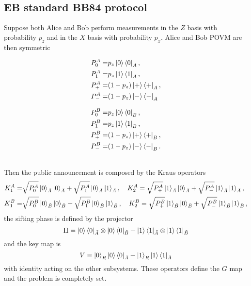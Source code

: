 \documentclass{article}
\begin{document}
    \subsection{EB standard BB84 protocol}
    Suppose both Alice and Bob perform measurements in the \(Z\) basis with probability \(p_z\) and in the \(X\) basis with probability \(p_x\).
    Alice and Bob POVM are then symmetric
    \\
    \begin{minipage}{.5\linewidth}
        \begin{align*}
            P^A_0 =& p_z \ket{0}\bra{0}_A,\\
            P^A_1 =& p_z \ket{1}\bra{1}_A,\\
            P^A_+ =& (1-p_z) \ket{+}\bra{+}_A,\\
            P^A_- =& (1-p_z) \ket{-}\bra{-}_A
        \end{align*}
    \end{minipage}
    \begin{minipage}{.5\linewidth}
        \begin{align*}
            P^B_0 =& p_z \ket{0}\bra{0}_B,\\
            P^B_1 =& p_z \ket{1}\bra{1}_B,\\
            P^B_+ =& (1-p_z) \ket{+}\bra{+}_B,\\
            P^B_- =& (1-p_z) \ket{-}\bra{-}_B.
        \end{align*}
    \end{minipage}
    \\
    Then the public announcement is composed by the Kraus operators
    \begin{align*}
        K^A_1 =& \sqrt{P^A_0}\ket{0}_{\tilde{A}}\ket{0}_{\bar{A}}+\sqrt{P^A_1}\ket{0}_{\tilde{A}}\ket{1}_{\bar{A}},\quad K^A_2 = \sqrt{P^A_+}\ket{1}_{\tilde{A}}\ket{0}_{\bar{A}}+\sqrt{P^A_-}\ket{1}_{\tilde{A}}\ket{1}_{\bar{A}},\\
        K^B_1 =& \sqrt{P^B_0}\ket{0}_{\tilde{B}}\ket{0}_{\bar{B}}+\sqrt{P^B_1}\ket{0}_{\tilde{B}}\ket{1}_{\bar{B}},\quad K^B_2 = \sqrt{P^B_+}\ket{1}_{\tilde{B}}\ket{0}_{\bar{B}}+\sqrt{P^B_-}\ket{1}_{\tilde{B}}\ket{1}_{\bar{B}},
    \end{align*}
    the sifting phase is defined by the projector
    \[\Pi=\ket{0}\bra{0}_{\tilde{A}}\otimes\ket{0}\bra{0}_{\tilde{B}}+\ket{1}\bra{1}_{\tilde{A}}\otimes\ket{1}\bra{1}_{\tilde{B}}\]
    and the key map is 
    \[V=\ket{0}_R\ket{0}\bra{0}_{\bar{A}}+\ket{1}_R\ket{1}\bra{1}_{\bar{A}}\]
    with identity acting on the other subsystems.
    These operators define the \(G\) map and the problem is completely set.
\end{document}
